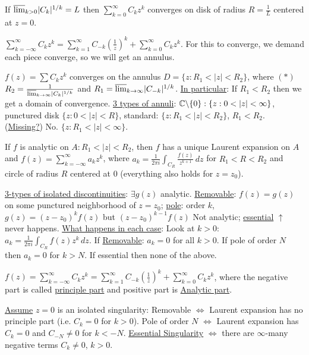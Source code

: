 \documentclass[]{article}
\begin{document}
\begin{recall}
	If $\overline{\lim}_{k>0} |C_k|^{1/k} = L$ then $\sum_{k=0}^\infty C_k z^k$ converges on disk of radius $R = \frac{1}{L}$ centered at $z=0$.
\end{recall}
\begin{recall}
	$\sum_{k=-\infty}^\infty C_k z^k = \sum_{k=1}^\infty C_{-k} \left( \frac{1}{z} \right)^k + \sum_{k=0}^\infty C_k z^k$. For this to converge, we demand each piece converge, so we will get an annulus.
\end{recall}
\begin{theorem}
	$f(z) = \sum C_k z^k$ converges on the annulus $D = \{z: R_1 < |z| < R_2\}$, where $(*)$ $R_2 = \frac{1}{\overline{\lim}_{k\rightarrow\infty} | C_k |^{1/k}}$ and $R_1 = \overline{\lim}_{k\rightarrow\infty} |C_{-k}|^{1/k}$. \ul{In particular}: If $R_1<R_2$ then we get a domain of convergence.
	\ul{3 types of annuli}: $\mb C\backslash\{0\} : \{z:0<|z| < \infty\}$, punctured disk $\{z: 0<|z|<R\}$, standard: $\{z: R_1 < |z| < R_2\}$, $R_1<R_2$. (\ul{Missing?}) No. $\{z: R_1 < |z| < \infty\}$.
\end{theorem}
\begin{theorem}
	If $f$ is analytic on $A: R_1 < |z| < R_2$, then $f$ has a unique Laurent expansion on $A$ and $f(z) = \sum_{k=-\infty}^\infty a_k z^k$, where $a_k = \frac{1}{2\pi i} \int_{C_R} \frac{f(z)}{z^{k+1}} \, dz$ for $R_1 < R < R_2$ and circle of radius $R$ centered at 0 (everything also holds for $z=z_0$).
\end{theorem}

\ul{3-types of isolated discontinuities}: $\exists g(z)$ analytic. \ul{Removable}: $f(z) = g(z)$ on some punctured neighborhood of $z=z_0$; \ul{pole}: order $k$, $g(z) = (z-z_0)^kf(z)$ but $(z-z_0)^{k-1}f(z)$ Not analytic; \ul{essential} $\uparrow$ never happens.
\ul{What happens in each case}: Look at $k>0$: $a_k = \frac{1}{2\pi i} \int_{C_R} f(z) z^k \, dz$. If \ul{Removable}: $a_k = 0$ for all $k>0$. If pole of order $N$ then $a_k = 0$ for $k>N$. If essential then none of the above.

\begin{definition}
	$f(z) = \sum_{k=-\infty}^\infty C_k z^k = \sum_{k=1}^\infty C_{-k} \left( \frac{1}{z} \right)^k + \sum_{k=0}^\infty C_k z^k$, where the negative part is called \ul{principle part} and positive part is \ul{Analytic part}.
\end{definition}

\ul{Assume} $z = 0$ is an isolated singularity: Removable $\iff$ Laurent expansion has no principle part (i.e. $C_k = 0$ for $k>0$). Pole of order $N$ $\iff$ Laurent expansion has $C_k = 0$ and $C_{-N}\neq 0$ for $k<-N$. \ul{Essential Singularity} $\iff$ there are $\infty$-many negative terms $C_k \neq 0$, $k>0$.
\end{document}
